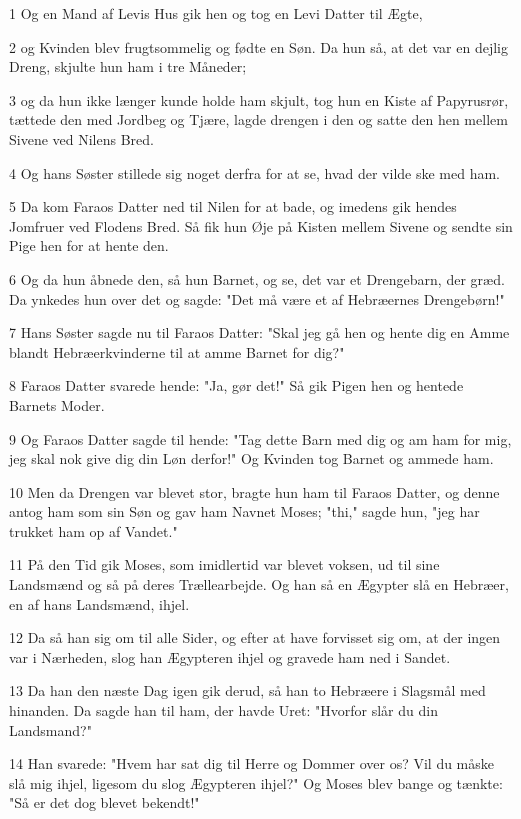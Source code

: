 \par 1 Og en Mand af Levis Hus gik hen og tog en Levi Datter til Ægte,
\par 2 og Kvinden blev frugtsommelig og fødte en Søn. Da hun så, at det var en dejlig Dreng, skjulte hun ham i tre Måneder;
\par 3 og da hun ikke længer kunde holde ham skjult, tog hun en Kiste af Papyrusrør, tættede den med Jordbeg og Tjære, lagde drengen i den og satte den hen mellem Sivene ved Nilens Bred.
\par 4 Og hans Søster stillede sig noget derfra for at se, hvad der vilde ske med ham.
\par 5 Da kom Faraos Datter ned til Nilen for at bade, og imedens gik hendes Jomfruer ved Flodens Bred. Så fik hun Øje på Kisten mellem Sivene og sendte sin Pige hen for at hente den.
\par 6 Og da hun åbnede den, så hun Barnet, og se, det var et Drengebarn, der græd. Da ynkedes hun over det og sagde: "Det må være et af Hebræernes Drengebørn!"
\par 7 Hans Søster sagde nu til Faraos Datter: "Skal jeg gå hen og hente dig en Amme blandt Hebræerkvinderne til at amme Barnet for dig?"
\par 8 Faraos Datter svarede hende: "Ja, gør det!" Så gik Pigen hen og hentede Barnets Moder.
\par 9 Og Faraos Datter sagde til hende: "Tag dette Barn med dig og am ham for mig, jeg skal nok give dig din Løn derfor!" Og Kvinden tog Barnet og ammede ham.
\par 10 Men da Drengen var blevet stor, bragte hun ham til Faraos Datter, og denne antog ham som sin Søn og gav ham Navnet Moses; "thi," sagde hun, "jeg har trukket ham op af Vandet."
\par 11 På den Tid gik Moses, som imidlertid var blevet voksen, ud til sine Landsmænd og så på deres Trællearbejde. Og han så en Ægypter slå en Hebræer, en af hans Landsmænd, ihjel.
\par 12 Da så han sig om til alle Sider, og efter at have forvisset sig om, at der ingen var i Nærheden, slog han Ægypteren ihjel og gravede ham ned i Sandet.
\par 13 Da han den næste Dag igen gik derud, så han to Hebræere i Slagsmål med hinanden. Da sagde han til ham, der havde Uret: "Hvorfor slår du din Landsmand?"
\par 14 Han svarede: "Hvem har sat dig til Herre og Dommer over os? Vil du måske slå mig ihjel, ligesom du slog Ægypteren ihjel?" Og Moses blev bange og tænkte: "Så er det dog blevet bekendt!"
